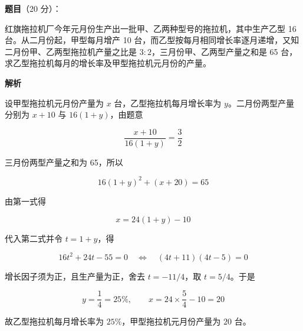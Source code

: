 \begin{answer}

\textbf{题目}（20 分）：

红旗拖拉机厂今年元月份生产出一批甲、乙两种型号的拖拉机，其中生产乙型 16 台。从二月份起，甲型每月增产 10 台，而乙型按每月相同增长率逐月递增，又知二月份甲、乙两型拖拉机产量之比是 $3:2$，三月份甲、乙两型产量之和是 65 台，求乙型拖拉机每月的增长率及甲型拖拉机元月份的产量。

\textbf{解析}

设甲型拖拉机元月份产量为 $x$ 台，乙型拖拉机每月增长率为 $y$。二月份两型产量分别为 $x+10$ 与 $16(1+y)$，由题意

\nopagebreak[4]
\[
\frac{x+10}{16(1+y)}=\frac32
\]

三月份两型产量之和为 65，所以

\nopagebreak[4]
\[
16(1+y)^2+(x+20)=65
\]

由第一式得

\nopagebreak[4]
\[
x=24(1+y)-10
\]

代入第二式并令 $t=1+y$，得

\nopagebreak[4]
\[
16t^2+24t-55=0
\quad\Longleftrightarrow\quad
(4t+11)(4t-5)=0
\]

增长因子须为正，且生产量为正，舍去 $t=-11/4$，取 $t=5/4$。于是

\nopagebreak[4]
\[
y=\frac14=25\%,
\qquad
x=24\times\frac54-10=20
\]

故乙型拖拉机每月增长率为 $25\%$，甲型拖拉机元月份产量为 $20$ 台。


\end{answer}